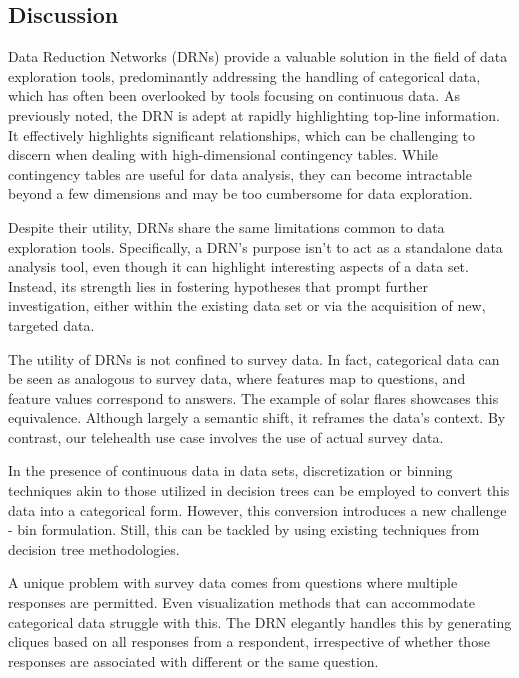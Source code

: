 \subsection{Discussion \label{Discussion}}

Data Reduction Networks (DRNs) provide a valuable solution in the field of data exploration tools, predominantly addressing the handling of categorical data, which has often been overlooked by tools focusing on continuous data. As previously noted, the DRN is adept at rapidly highlighting top-line information. It effectively highlights significant relationships, which can be challenging to discern when dealing with high-dimensional contingency tables. While contingency tables are useful for data analysis, they can become intractable beyond a few dimensions and may be too cumbersome for data exploration.

Despite their utility, DRNs share the same limitations common to data exploration tools. Specifically, a DRN's purpose isn't to act as a standalone data analysis tool, even though it can highlight interesting aspects of a data set. Instead, its strength lies in fostering hypotheses that prompt further investigation, either within the existing data set or via the acquisition of new, targeted data.

The utility of DRNs is not confined to survey data. In fact, categorical data can be seen as analogous to survey data, where features map to questions, and feature values correspond to answers. The example of solar flares showcases this equivalence. Although largely a semantic shift, it reframes the data's context. By contrast, our telehealth use case involves the use of actual survey data.

In the presence of continuous data in data sets, discretization or binning techniques akin to those utilized in decision trees can be employed to convert this data into a categorical form. However, this conversion introduces a new challenge - bin formulation. Still, this can be tackled by using existing techniques from decision tree methodologies\cite{garcia}.

A unique problem with survey data comes from questions where multiple responses are permitted. Even visualization methods that can accommodate categorical data struggle with this. The DRN elegantly handles this by generating cliques based on all responses from a respondent, irrespective of whether those responses are associated with different or the same question.


